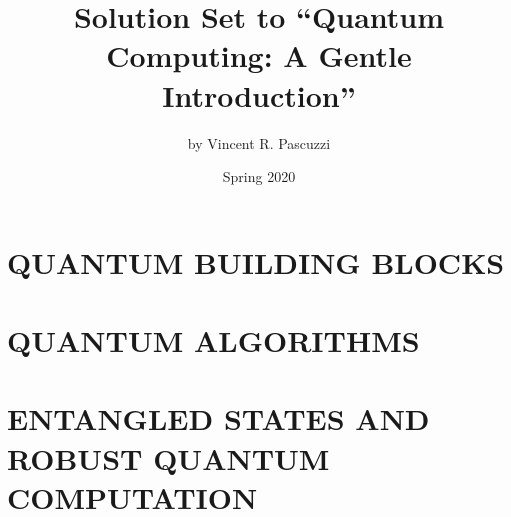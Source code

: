\documentclass[10pt, oneside]{memoir}
\title{Solution Set to ``Quantum Computing: A Gentle Introduction''}
\author{by Vincent R. Pascuzzi}
\date{Spring 2020}
\newcommand*{\pathI}{Part_I}
\newcommand*{\pathII}{Part_II}
\newcommand*{\pathIII}{Part_III}
\begin{document}
\setcounter{chapter}{1}

\maketitle
\begin{KeepFromToc}
    \tableofcontents
\end{KeepFromToc}

\newpage

\part{QUANTUM BUILDING BLOCKS}

\newpage

\newpage

\newpage

\newpage


\newpage

\part{QUANTUM ALGORITHMS}

\newpage

\newpage


\newpage

\part{ENTANGLED STATES AND ROBUST QUANTUM COMPUTATION}

\newpage

\newpage

\newpage

\end{document}

